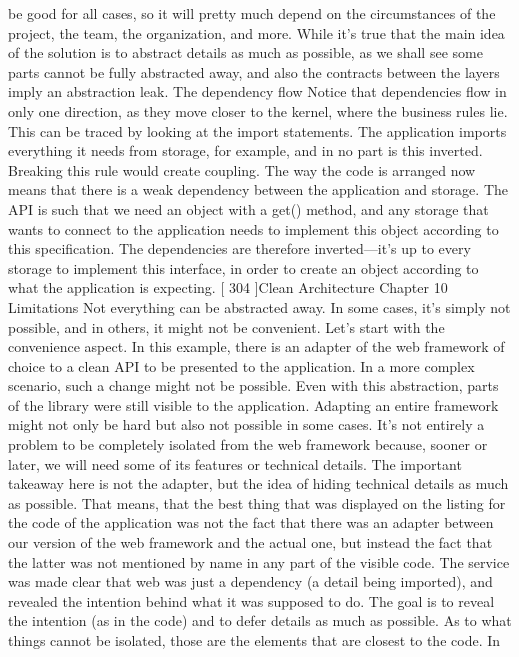 \documentclass[a4paper,10pt,english]{sphinxmanual}
\begin{document}
be good for all cases, so it will pretty much depend on the circumstances of the project, the
team, the organization, and more.
While it’s true that the main idea of the solution is to abstract details as much as possible, as
we shall see some parts cannot be fully abstracted away, and also the contracts between the
layers imply an abstraction leak.
The dependency flow
Notice that dependencies flow in only one direction, as they move closer to the kernel,
where the business rules lie. This can be traced by looking at the import statements. The
application imports everything it needs from storage, for example, and in no part is this
inverted.
Breaking this rule would create coupling. The way the code is arranged now means that
there is a weak dependency between the application and storage. The API is such that we
need an object with a get() method, and any storage that wants to connect to the
application needs to implement this object according to this specification. The dependencies
are therefore inverted—it’s up to every storage to implement this interface, in order to
create an object according to what the application is expecting.
{[} 304 {]}Clean Architecture
Chapter 10
Limitations
Not everything can be abstracted away. In some cases, it’s simply not possible, and in
others, it might not be convenient. Let’s start with the convenience aspect.
In this example, there is an adapter of the web framework of choice to a clean API to be
presented to the application. In a more complex scenario, such a change might not be
possible. Even with this abstraction, parts of the library were still visible to the application.
Adapting an entire framework might not only be hard but also not possible in some cases.
It’s not entirely a problem to be completely isolated from the web framework because,
sooner or later, we will need some of its features or technical details.
The important takeaway here is not the adapter, but the idea of hiding technical details as
much as possible. That means, that the best thing that was displayed on the listing for the
code of the application was not the fact that there was an adapter between our version of
the web framework and the actual one, but instead the fact that the latter was not
mentioned by name in any part of the visible code. The service was made clear that web
was just a dependency (a detail being imported), and revealed the intention behind what it
was supposed to do. The goal is to reveal the intention (as in the code) and to defer details
as much as possible.
As to what things cannot be isolated, those are the elements that are closest to the code. In
\end{document}
